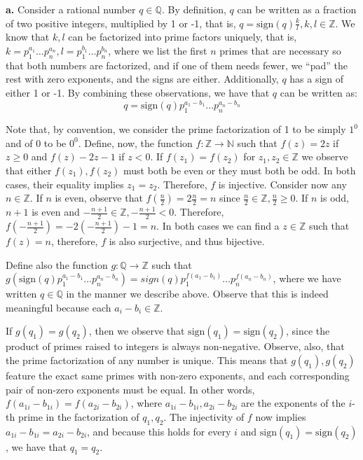 \begin{solution}

    \textbf{a.} Consider a rational number $q \in \mathbb{Q}$. By definition, $q$ can be written as a fraction of two positive integers, multiplied by 1 or -1, that is, $q = \text{sign}(q)\frac{k}{l}, k, l \in \mathbb{Z}$. We know that $k, l$ can be factorized into prime factors uniquely, that is, $k = p_1^{a_1} \ldots p_n^{a_n}, l = p_1^{b_1} \ldots p_n^{b_n}$, where we list the first $n$ primes that are necessary so that both numbers are factorized, and if one of them needs fewer, we ``pad'' the rest with zero exponents, and the signs are either. Additionally, $q$ has a sign of either 1 or -1. By combining these observations, we have that $q$ can be written as:
    $$q = \text{sign}(q)p_1^{a_1-b_1}\ldots p_n^{a_n-b_n}$$

    Note that, by convention, we consider the prime factorization of 1 to be simply $1^0$ and of 0 to be $0^0$. Define, now, the function $f:\mathbb{Z} \rightarrow \mathbb{N}$ such that $f(z) = 2z$ if $z \geq 0$ and $f(z) -2z - 1$ if $z < 0$. If $f(z_1) = f(z_2)$ for $z_1, z_2 \in \mathbb{Z}$ we observe that either $f(z_1), f(z_2)$ must both be even or they must both be odd. In both cases, their equality implies $z_1 = z_2$. Therefore, $f$ is injective. Consider now any $n \in \mathbb{Z}$. If $n$ is even, observe that $f(\frac{n}{2}) = 2\frac{n}{2} = n$ since $\frac{n}{2} \in \mathbb{Z}, \frac{n}{2} \geq 0$. If $n$ is odd, $n+1$ is even and $-\frac{n+1}{2} \in \mathbb{Z}, -\frac{n+1}{2} < 0$. Therefore, $f(-\frac{n+1}{2}) = -2(-\frac{n+1}{2}) - 1 = n$. In both cases we can find a $z \in \mathbb{Z}$ such that $f(z) = n$, therefore, $f$ is also surjective, and thus bijective.

    Define also the function $g: \mathbb{Q} \rightarrow \mathbb{Z}$ such that $g(\text{sign}(q)p_1^{a_1-b_1}\ldots p_n^{a_n-b_n}) = sign(q)p_1^{f(a_1-b_1)}\ldots p_n^{f(a_n-b_n)}$, where we have written $q \in \mathbb{Q}$ in the manner we describe above. Observe that this is indeed meaningful because each $a_i - b_i \in \mathbb{Z}$. 
    
    If $g(q_1) = g(q_2)$, then we observe that $\text{sign}(q_1) = \text{sign}(q_2)$, since the product of primes raised to integers is always non-negative. Observe, also, that the prime factorization of any number is unique. This means that $g(q_1), g(q_2)$ feature the exact same primes with non-zero exponents, and each corresponding pair of non-zero exponents must be equal. In other words, $f(a_{1i}-b_{1i}) = f(a_{2i}-b_{2i})$, where $a_{1i}-b_{1i}, a_{2i}-b_{2i}$ are the exponents of the $i$-th prime in the factorization of $q_1, q_2$. The injectivity of $f$ now implies $a_{1i}-b_{1i} = a_{2i}-b_{2i}$, and because this holds for every $i$ and $\text{sign}(q_1) = \text{sign}(q_2)$, we have that $q_1=q_2$.


\end{solution}
